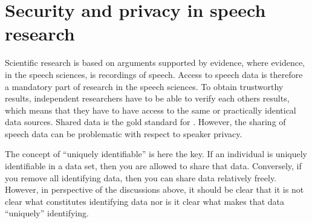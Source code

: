 \documentclass[letterpaper,10pt,english]{jupyterBook}
\begin{document}
\section{Security and privacy in speech research}
\label{\detokenize{Security_and_privacy:security-and-privacy-in-speech-research}}
\sphinxAtStartPar
Scientific research is based on arguments supported by evidence, where
evidence, in the speech sciences, is recordings of speech. Access to
speech data is therefore a mandatory part of research in the speech
sciences. To obtain trustworthy results, independent researchers have to
be able to verify each others results, which means that they have to
have access to the same or practically identical data sources. Shared
data is the gold standard for . However, the
sharing of speech data can be problematic with respect to speaker
privacy.

\sphinxAtStartPar
The concept of “uniquely identifiable” is here the key. If an individual
is  uniquely identifiable in a data set, then you are allowed to
share that data. Conversely, if you remove all identifying data, then
you can share data relatively freely. However, in perspective of the
discussions above, it should be clear that it is not clear what
constitutes identifying data nor is it clear what makes that data
“uniquely” identifying.
\end{document}
